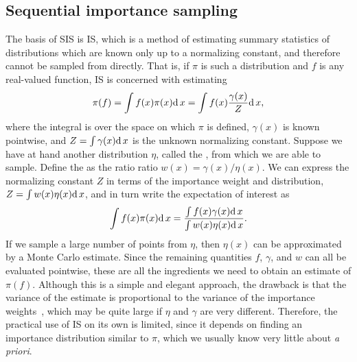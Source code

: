 \subsection{Sequential importance sampling}
\label{subsec:sis}

The basis of \gls{SIS} is \gls{IS}, which is a method of estimating summary
statistics of distributions which are known only up to a normalizing constant,
and therefore cannot be sampled from directly. That is, if $\pi$ is such a
distribution and $f$ is any real-valued function, \gls{IS} is concerned with
estimating
\[
  \pi(f) = \int f(x)\pi(x)\mathrm{d}\, x = \int f(x) \frac{\gamma(x)}{Z} \mathrm{d}\, x,
\]
where the integral is over the space on which $\pi$ is defined, $\gamma(x)$ is
known pointwise, and $Z = \int \gamma(x) \mathrm{d}\, x$ is the unknown normalizing
constant. Suppose we have at hand another distribution $\eta$, called the
, from which we are able to sample. Define the
 as the ratio ratio $w(x) = \gamma(x)/\eta(x)$. We can
express the normalizing constant $Z$ in terms of the importance weight and
distribution, $Z = \int w(x) \eta(x) \mathrm{d}\, x$, and in turn write the expectation
of interest as
\[
  \int f(x) \pi(x) \mathrm{d}\, x = \frac{\int f(x) \gamma(x) \mathrm{d}\, x}
                               {\int w(x) \eta(x) \mathrm{d}\, x}.
\]
If we sample a large number of points from $\eta$, then $\eta(x)$ can be
approximated by a Monte Carlo estimate. Since the remaining quantities $f$,
$\gamma$, and $w$ can all be evaluated pointwise, these are all the ingredients
we need to obtain an estimate of $\pi(f)$. Although this is a simple and
elegant approach, the drawback is that the variance of the estimate is
proportional to the variance of the importance weights~\autocite{liu2008monte},
which may be quite large if $\eta$ and $\gamma$ are very different. Therefore,
the practical use of \gls{IS} on its own is limited, since it depends on
finding an importance distribution similar to $\pi$, which we usually know very
little about \textit{a priori}.

